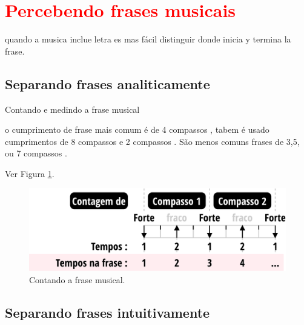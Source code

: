 \section{\textcolor{red}{Percebendo frases musicais}}

quando a musica inclue letra es mas fácil distinguir donde inicia y termina la frase.


\subsection{Separando frases analiticamente}

Contando e medindo a frase musical

\cite[pp. 148,150]{medteoria}

\cite[pp. 336]{medteoria}

o cumprimento de frase mais comum é
de 4 compassos \cite[pp. 624]{latham2008diccionario} \cite[pp. 335]{medteoria} \cite[pp. 34]{bennett1993elementos},
tabem é usado cumprimentos de 8 compassos \cite[pp. 335]{medteoria} \cite[pp. 34]{bennett1993elementos}
e 2 compassos \cite[pp. 34]{bennett1993elementos}.
São menos comuns frases de 3,5, ou 7 compassos \cite[pp. 34]{bennett1993elementos}.

Ver Figura \ref{fig:contagemtemposfrase}.
\begin{figure}
    \centering
    \includegraphics[width=\textwidth]{chapters/cap-musicalidade/contagemtemposfrase.eps}
    \caption{Contando a frase musical.}
    \label{fig:contagemtemposfrase}
\end{figure}



\subsection{Separando frases intuitivamente}


